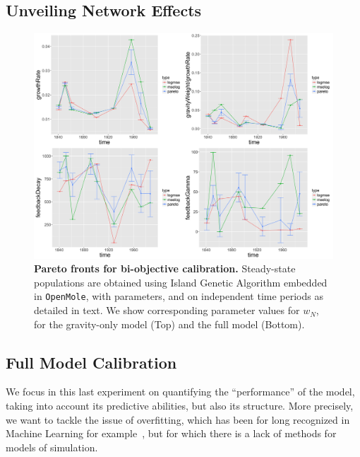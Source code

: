 \documentclass[Royal,sageh,times]{sagej}
\begin{document}
\subsection*{Unveiling Network Effects}






\begin{figure}
\centering
\includegraphics[width=\textwidth]{figures/Fig6}
\caption{\textbf{Pareto fronts for bi-objective calibration.} Steady-state populations are obtained using Island Genetic Algorithm embedded in \texttt{OpenMole}, with parameters, and on independent time periods as detailed in text. We show  corresponding parameter values for $w_N$, for the gravity-only model (Top) and the full model (Bottom).}
\end{figure}







\subsection*{Full Model Calibration}

We focus in this last experiment on quantifying the ``performance'' of the model, taking into account its predictive abilities, but also its structure. More precisely, we want to tackle the issue of overfitting, which has been for long recognized in Machine Learning for example~\cite{dietterich1995overfitting}, but for which there is a lack of methods for models of simulation.
\end{document}
